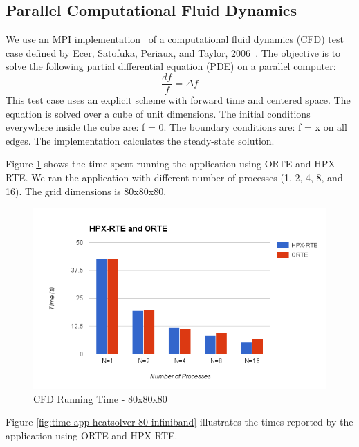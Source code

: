 \subsection{Parallel Computational Fluid Dynamics}
We use an MPI implementation~\cite{resch1999comparison} of a computational fluid dynamics (CFD) test case defined by Ecer, Satofuka, Periaux, and Taylor, 2006~\cite{ecer1996parallel}.
The objective is to solve the following partial differential equation (PDE) on a parallel computer:
\[
\frac{df}{f} = \Delta f
\]
This test case uses an explicit scheme with forward time and centered space. The equation is solved over a cube of unit dimensions. The initial conditions everywhere inside the cube are: f = 0. The boundary conditions are: f = x on all edges. The implementation calculates the steady-state solution.

Figure \ref{fig:time-all-heatsolver-80-infiniband} shows the time spent running the application using ORTE and HPX-RTE. We ran the application with different number of processes (1, 2, 4, 8, and 16). The grid dimensions is 80x80x80.

\begin{figure}[h!]
\centering
\includegraphics[scale=0.7]{images/time-all-heatsolver-80-infiniband.png}
\caption[CFD Running Time - 80x80x80]{CFD Running Time - 80x80x80}
\label{fig:time-all-heatsolver-80-infiniband}
\end{figure}

Figure \ref{fig:time-app-heatsolver-80-infiniband} illustrates the times reported by the application using ORTE and HPX-RTE.

